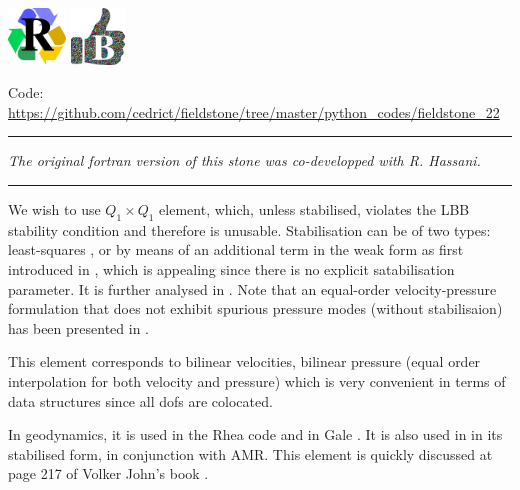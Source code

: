 
\includegraphics[height=1.5cm]{images/pictograms/replication}
\includegraphics[height=1.5cm]{images/pictograms/benchmark}



\begin{center}
\inpython
{\small Code: \url{https://github.com/cedrict/fieldstone/tree/master/python_codes/fieldstone_22}}
\end{center}

\par\noindent\rule{\textwidth}{0.4pt}

{\sl The original fortran version of this stone was co-developped with R. Hassani.}

\par\noindent\rule{\textwidth}{0.4pt}



We wish to use $Q_1 \times Q_1$ element, which, unless stabilised,
violates  the LBB stability condition and therefore is unusable. 
Stabilisation can be of two types: least-squares \cite{dohu03,temr92,kibr12,gubl07},
or by means of an additional term in the weak form as first introduced in \cite{dobo04,bodg06}, 
which is appealing since there is no explicit satabilisation parameter.
It is further analysed in \cite{nosi01,lihc09,hufb86,shry78,grcc95}.
Note that an equal-order velocity-pressure formulation that does not exhibit spurious
pressure modes (without stabilisaion) has been presented in \cite{risc86}.

This element corresponds to bilinear velocities, bilinear pressure 
(equal order interpolation for both velocity and pressure) which is 
very convenient in terms of data structures since all dofs are colocated.

In geodynamics, it is used in the Rhea code \cite{stgb10,busa13} and in Gale \cite{arbi13}.
It is also used in \cite{lezh11} in its stabilised form, in conjunction with AMR. 
This element is quickly discussed at page 217 of Volker John's book \cite{john16}.

